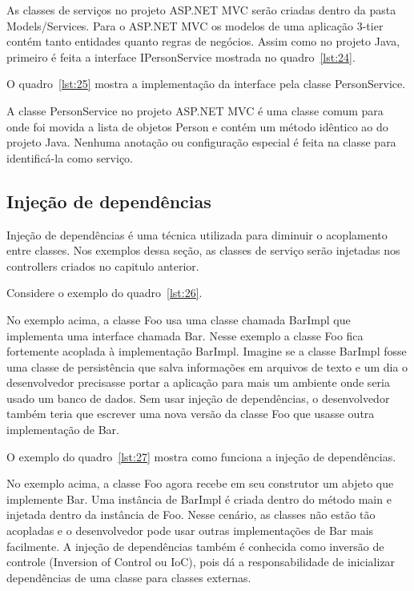 \documentclass[a4paper,12pt]{article}
\newcommand{\javacode}[3] {
	
	\FloatBarrier
}
\newcommand{\sharpcode}[3] {
	
	\FloatBarrier
}
\begin{document}
As classes de serviços no projeto ASP.NET MVC serão criadas dentro da pasta Models/Services. Para o ASP.NET MVC os modelos de uma aplicação 3-tier contém tanto entidades quanto regras de negócios. Assim como no projeto Java, primeiro é feita a interface IPersonService mostrada no quadro~\ref{lst:24}.

\sharpcode{code/24.txt}{Interface IPersonService}{lst:24}

O quadro~\ref{lst:25} mostra a implementação da interface pela classe PersonService.

\sharpcode{code/25.txt}{Classe PersonService}{lst:25}

A classe PersonService no projeto ASP.NET MVC é uma classe comum para onde foi movida a lista de objetos Person e contém um método idêntico ao do projeto Java. Nenhuma anotação ou configuração especial é feita na classe para identificá-la como serviço.

\subsection{Injeção de dependências}

Injeção de dependências é uma técnica utilizada para diminuir o acoplamento entre classes. Nos exemplos dessa seção, as classes de serviço serão injetadas nos controllers criados no capitulo anterior. 

Considere o exemplo do quadro~\ref{lst:26}.

\javacode{code/26.txt}{Exemplo de classes fortemente acopladas}{lst:26}

No exemplo acima, a classe Foo usa uma classe chamada BarImpl que implementa uma interface chamada Bar. Nesse exemplo a classe Foo fica fortemente acoplada à implementação BarImpl. Imagine se a classe BarImpl fosse uma classe de persistência que salva informações em arquivos de texto e um dia o desenvolvedor precisasse portar a aplicação para mais um ambiente onde seria usado um banco de dados. Sem usar injeção de dependências, o desenvolvedor também teria que escrever uma nova versão da classe Foo que usasse outra implementação de Bar.

O exemplo do quadro~\ref{lst:27} mostra como funciona a injeção de dependências.

\javacode{code/27.txt}{Exemplo de classes fracamente acopladas}{lst:27}

No exemplo acima, a classe Foo agora recebe em seu construtor um abjeto que implemente Bar. Uma instância de BarImpl é criada dentro do método main e injetada dentro da instância de Foo. Nesse cenário, as classes não estão tão acopladas e o desenvolvedor pode usar outras implementações de Bar mais facilmente. A injeção de dependências também é conhecida como inversão de controle (Inversion of Control ou IoC), pois dá a responsabilidade de inicializar dependências de uma classe para classes externas. 
\end{document}
